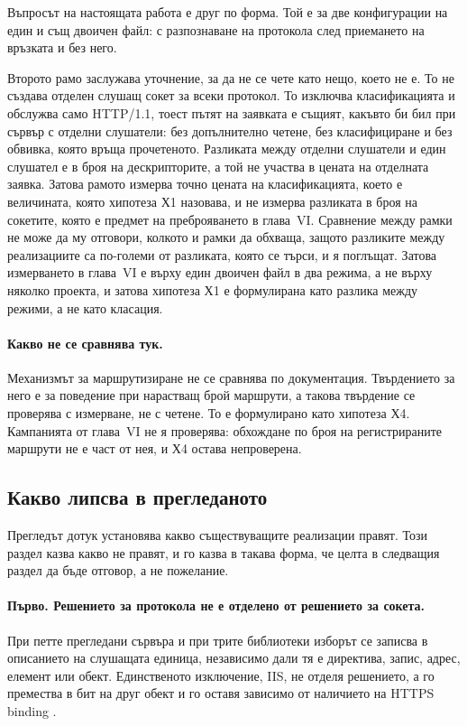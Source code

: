 Въпросът на настоящата работа е друг по форма. Той е за две конфигурации на един и същ двоичен
файл: с разпознаване на протокола след приемането на връзката и без него.

Второто рамо заслужава уточнение, за да не се чете като нещо, което не е. То не създава
отделен слушащ сокет за всеки протокол. То изключва класификацията и обслужва само HTTP/1.1,
тоест пътят на заявката е същият, какъвто би бил при сървър с отделни слушатели: без
допълнително четене, без класифициране и без обвивка, която връща прочетеното. Разликата
между отделни слушатели и един слушател е в броя на дескрипторите, а той не участва в цената
на отделната заявка. Затова рамото измерва точно цената на класификацията, което е величината,
която хипотеза Х1 назовава, и не измерва разликата в броя на сокетите, която е предмет на
преброяването в глава~VI. Сравнение между рамки не може да му отговори, колкото и рамки да обхваща,
защото разликите между реализациите са по-големи от разликата, която се търси, и я поглъщат.
Затова измерването в глава~VI е върху един двоичен файл в два режима, а не върху няколко
проекта, и затова хипотеза Х1 е формулирана като разлика между режими, а не като класация.

\paragraph{Какво не се сравнява тук.} Механизмът за маршрутизиране не се сравнява по
документация. Твърдението за него е за поведение при нарастващ брой маршрути, а такова
твърдение се проверява с измерване, не с четене. То е формулирано като хипотеза Х4. Кампанията от глава~VI не я
проверява: обхождане по броя на регистрираните маршрути не е част от нея, и Х4 остава
непроверена.

\subsection{Какво липсва в прегледаното}
\label{sec:gap}

Прегледът дотук установява какво съществуващите реализации правят. Този раздел казва какво не
правят, и го казва в такава форма, че целта в следващия раздел да бъде отговор, а не пожелание.

\paragraph{Първо. Решението за протокола не е отделено от решението за сокета.} При петте
прегледани сървъра и при трите библиотеки изборът се записва в описанието на слушащата
единица, независимо дали тя е директива, запис, адрес, елемент или обект. Единственото
изключение, IIS, не отделя решението, а го премества в бит на друг обект и го оставя зависимо
от наличието на HTTPS binding \cite{iisbinding}.

